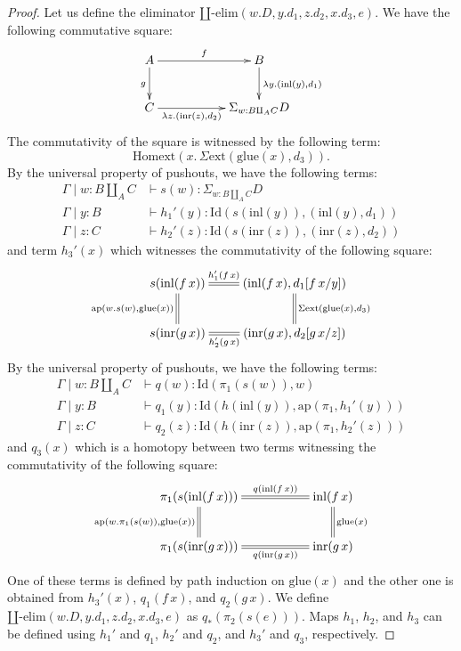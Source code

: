 \documentclass[reqno]{mscs}
\newcommand{\fs}[1]{\mathrm{#1}}
\newcommand{\Id}{\fs{Id}}
\newcommand{\pmap}{\fs{ap}}
\newcommand{\Idext}{\fs{Homext}}
\numberwithin{figure}{section}
\begin{document}
\begin{proof}
Let us define the eliminator $\amalg\text{-}\fs{elim}(w.D, y.d_1, z.d_2, x.d_3, e)$.
We have the following commutative square:
\[ \xymatrix{ A \ar[rr]^-f \ar[d]_g                    & & B \ar[d]^{\lambda y.(\fs{inl}(y),d_1)} \\
              C \ar[rr]_-{\lambda z.(\fs{inr}(z),d_2)} & & \Sigma_{w : B \amalg_A C} D
            } \]
The commutativity of the square is witnessed by the following term:
\[ \Idext(x.\,\Sigma\fs{ext}(\fs{glue}(x),d_3)). \]
By the universal property of pushouts, we have the following terms:
\begin{align*}
\Gamma \mid w : B \amalg_A C & \vdash s(w) : \Sigma_{w : B \amalg_A C} D \\
\Gamma \mid y : B & \vdash h_1'(y) : \Id(s(\fs{inl}(y)),(\fs{inl}(y),d_1)) \\
\Gamma \mid z : C & \vdash h_2'(z) : \Id(s(\fs{inr}(z)),(\fs{inr}(z),d_2))
\end{align*}
and term $h_3'(x)$ which witnesses the commutativity of the following square:
\[ \xymatrix{ s(\fs{inl}(f\,x)) \ar@{=}[r]^-{h_1'(f\,x)} \ar@{=}[d]_{\pmap(w.s(w),\fs{glue}(x))} & (\fs{inl}(f\,x),d_1[f\,x/y]) \ar@{=}[d]^{\Sigma\fs{ext}(\fs{glue}(x),d_3)} \\
              s(\fs{inr}(g\,x)) \ar@{=}[r]_-{h_2'(g\,x)} & (\fs{inr}(g\,x),d_2[g\,x/z])
            } \]
By the universal property of pushouts, we have the following terms:
\begin{align*}
\Gamma \mid w : B \amalg_A C & \vdash q(w) : \Id(\pi_1(s(w)),w) \\
\Gamma \mid y : B & \vdash q_1(y) : \Id(h(\fs{inl}(y)),\pmap(\pi_1,h_1'(y))) \\
\Gamma \mid z : C & \vdash q_2(z) : \Id(h(\fs{inr}(z)),\pmap(\pi_1,h_2'(z)))
\end{align*}
and $q_3(x)$ which is a homotopy between two terms witnessing the commutativity of the following square:
\[ \xymatrix{ \pi_1(s(\fs{inl}(f\,x))) \ar@{=}[rr]^-{q(\fs{inl}(f\,x))} \ar@{=}[d]_{\pmap(w.\pi_1(s(w)),\fs{glue}(x))} & & \fs{inl}(f\,x) \ar@{=}[d]^{\fs{glue}(x)} \\
              \pi_1(s(\fs{inr}(g\,x))) \ar@{=}[rr]_-{q(\fs{inr}(g\,x))}                                                & & \fs{inr}(g\,x)
            } \]
One of these terms is defined by path induction on $\fs{glue}(x)$ and the other one is obtained from $h_3'(x)$, $q_1(f\,x)$, and $q_2(g\,x)$.
We define $\amalg\text{-}\fs{elim}(w.D, y.d_1, z.d_2, x.d_3, e)$ as $q_*(\pi_2(s(e)))$.
Maps $h_1$, $h_2$, and $h_3$ can be defined using $h_1'$ and $q_1$, $h_2'$ and $q_2$, and $h_3'$ and $q_3$, respectively.
\end{proof}
\end{document}
